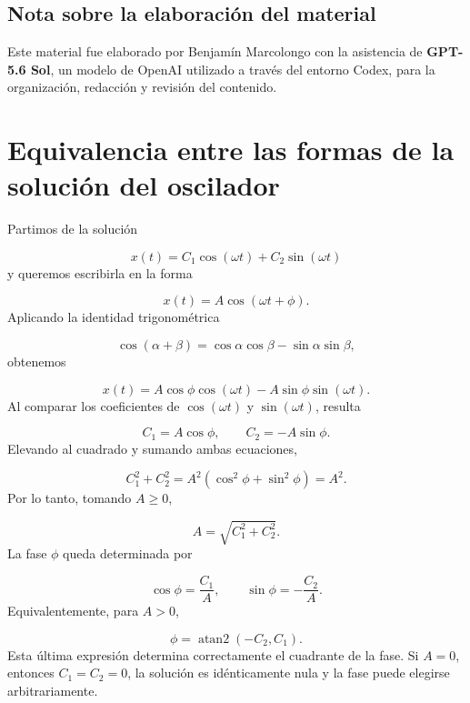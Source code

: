 \documentclass[12pt,a4paper]{article}
\begin{document}
	\subsection*{Nota sobre la elaboración del material}
	
	Este material fue elaborado por Benjamín Marcolongo con la asistencia de \textbf{GPT-5.6 Sol}, un modelo de OpenAI utilizado a través del entorno Codex, para la organización, redacción y revisión del contenido.
	
	\clearpage
	\appendix
	
	\section{Equivalencia entre las formas de la solución del oscilador}
	
	Partimos de la solución
	
	\[
	x(t)=C_1\cos(\omega t)+C_2\sin(\omega t)
	\]
	y queremos escribirla en la forma
	
	\[
	x(t)=A\cos(\omega t+\phi).
	\]
	Aplicando la identidad trigonométrica
	
	\[
	\cos(\alpha+\beta)
	=
	\cos\alpha\cos\beta
	-
	\sin\alpha\sin\beta,
	\]
	obtenemos
	
	\[
	x(t)
	=
	A\cos\phi\cos(\omega t)
	-
	A\sin\phi\sin(\omega t).
	\]
	Al comparar los coeficientes de \(\cos(\omega t)\) y \(\sin(\omega t)\), resulta
	
	\[
	C_1=A\cos\phi,
	\qquad
	C_2=-A\sin\phi.
	\]
	Elevando al cuadrado y sumando ambas ecuaciones,
	
	\[
	C_1^2+C_2^2
	=
	A^2\left(\cos^2\phi+\sin^2\phi\right)
	=
	A^2.
	\]
	Por lo tanto, tomando \(A\geq 0\),
	
	\[
	A=\sqrt{C_1^2+C_2^2}.
	\]
	La fase \(\phi\) queda determinada por
	
	\[
	\cos\phi=\frac{C_1}{A},
	\qquad
	\sin\phi=-\frac{C_2}{A}.
	\]
	Equivalentemente, para \(A>0\),
	
	\[
	\phi=\operatorname{atan2}(-C_2,C_1).
	\]
	Esta última expresión determina correctamente el cuadrante de la fase. Si \(A=0\), entonces \(C_1=C_2=0\), la solución es idénticamente nula y la fase puede elegirse arbitrariamente.
\end{document}
